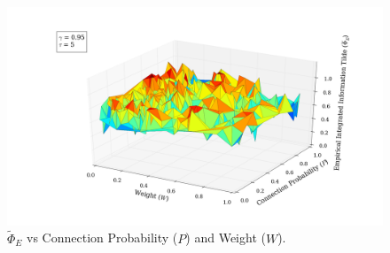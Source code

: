 \documentclass[a4paper,11pt]{article}
\begin{document}
\begin{figure}[H]
\begin{minipage}[b]{0.5\linewidth}
\begin{center}
		\end{center}
		\vspace{4ex}
	\end{minipage}
	\begin{minipage}[b]{0.5\linewidth}
		\begin{center}
		\includegraphics[scale = 0.2]{figures/snn/p_w_phi_tilde_95_5}
		\end{center}
		\vspace{4ex}
	\end{minipage}
	\caption{
		$\widetilde{\Phi}_E$ vs Connection Probability ($P$) and Weight ($W$).
		\label{fig:p_w_phi_tilde_all}
	}
\end{figure}

\end{document}
